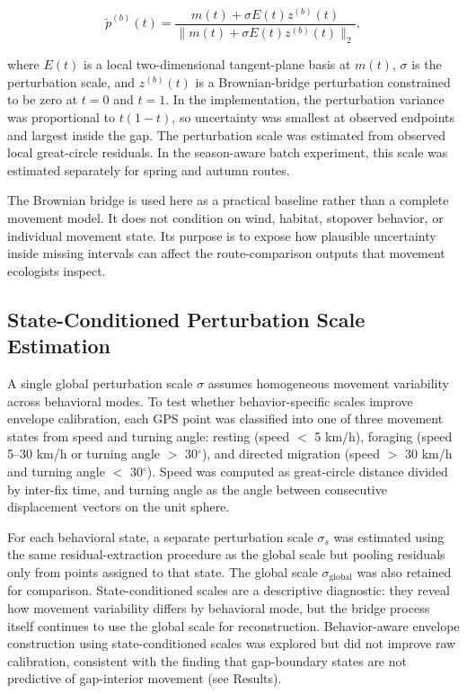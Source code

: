 \documentclass[pdflatex,sn-vancouver-num]{sn-jnl}
\begin{document}
\[
\tilde p^{(b)}(t)
= \frac{m(t) + \sigma E(t) z^{(b)}(t)}
{\lVert m(t) + \sigma E(t) z^{(b)}(t)\rVert_2},
\]

where $E(t)$ is a local two-dimensional tangent-plane basis at $m(t)$, $\sigma$ is the perturbation scale, and $z^{(b)}(t)$ is a Brownian-bridge perturbation constrained to be zero at $t=0$ and $t=1$. In the implementation, the perturbation variance was proportional to $t(1-t)$, so uncertainty was smallest at observed endpoints and largest inside the gap. The perturbation scale was estimated from observed local great-circle residuals. In the season-aware batch experiment, this scale was estimated separately for spring and autumn routes.

The Brownian bridge is used here as a practical baseline rather than a complete movement model. It does not condition on wind, habitat, stopover behavior, or individual movement state. Its purpose is to expose how plausible uncertainty inside missing intervals can affect the route-comparison outputs that movement ecologists inspect.

\subsection{State-Conditioned Perturbation Scale Estimation}\label{state-conditioned-scale-estimation}

A single global perturbation scale $\sigma$ assumes homogeneous movement variability across behavioral modes. To test whether behavior-specific scales improve envelope calibration, each GPS point was classified into one of three movement states from speed and turning angle: resting (speed $<$ 5 km/h), foraging (speed 5--30 km/h or turning angle $>$ 30$^\circ$), and directed migration (speed $>$ 30 km/h and turning angle $<$ 30$^\circ$). Speed was computed as great-circle distance divided by inter-fix time, and turning angle as the angle between consecutive displacement vectors on the unit sphere.

For each behavioral state, a separate perturbation scale $\sigma_s$ was estimated using the same residual-extraction procedure as the global scale but pooling residuals only from points assigned to that state. The global scale $\sigma_{\text{global}}$ was also retained for comparison. State-conditioned scales are a descriptive diagnostic: they reveal how movement variability differs by behavioral mode, but the bridge process itself continues to use the global scale for reconstruction. Behavior-aware envelope construction using state-conditioned scales was explored but did not improve raw calibration, consistent with the finding that gap-boundary states are not predictive of gap-interior movement (see Results).
\end{document}
